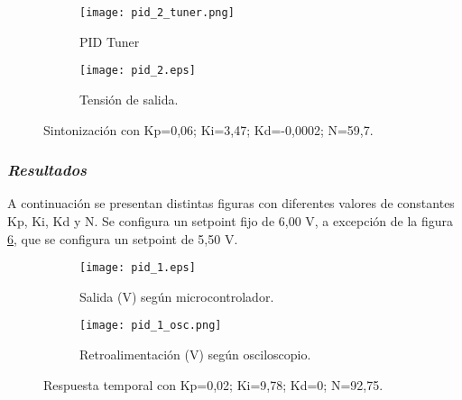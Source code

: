 \begin{figure}[H]
    \centering

    \begin{subfigure}[b]{0.49\textwidth}
        \centering
        \texttt{[image: pid\_2\_tuner.png]}
        \caption{PID Tuner}
        \label{fig:pid2_tuner}
    \end{subfigure}
    \begin{subfigure}[b]{0.49\textwidth}
        \centering
        \texttt{[image: pid\_2.eps]}
        \caption{Tensión de salida.}
        \label{fig:pid2_micro}
    \end{subfigure}

    \vspace{-0.25cm}
    \caption{Sintonización con Kp=0,06; Ki=3,47; Kd=-0,0002; N=59,7.}
    \label{fig:sintonizacion}
\end{figure}
\vspace{-0.5cm}

\subsubsection*{\it{Resultados}}
\vspace{-0.25cm}

A continuación se presentan distintas figuras con diferentes valores de constantes Kp, Ki, Kd y N. Se configura
un setpoint fijo de 6,00 V, a excepción de la figura \ref{fig:pid1}, que se configura un setpoint de 5,50 V.

\begin{figure}[H]
    \centering

    \begin{subfigure}[b]{0.49\textwidth}
        \centering
        \texttt{[image: pid\_1.eps]}
        \caption{Salida (V) según microcontrolador.}
        \label{fig:pid1_micro}
    \end{subfigure}
    \begin{subfigure}[b]{0.49\textwidth}
        \centering
        \texttt{[image: pid\_1\_osc.png]}
        \caption{Retroalimentación (V) según osciloscopio.}
        \label{fig:pid1_osciloscopio}
    \end{subfigure}

    \vspace{-0.25cm}
    \caption{Respuesta temporal con Kp=0,02; Ki=9,78; Kd=0; N=92,75.}
    \label{fig:pid1}
\end{figure}
\vspace{-0.5cm}

